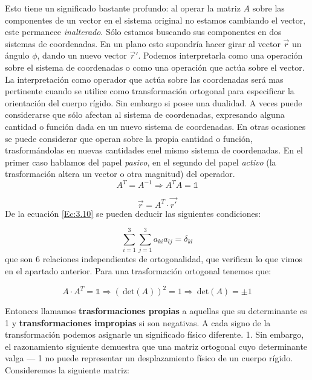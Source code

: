 \documentclass[12pt,a4paper]{book}
\newcommand{\Det}{\ \mathrm{det}}
\begin{document}
Esto tiene un significado bastante profundo: al operar la matriz $A$ sobre las componentes de un vector en el sistema original no estamos cambiando el vector, este permanece \textit{inalterado}. Sólo estamos buscando sus componentes en dos sistemas de coordenadas. En un plano esto supondría hacer girar al vector $\vec{r}$ un ángulo $\phi$, dando un nuevo vector $\vec{r}'$. Podemos interpretarla como una operación sobre el sistema de coordenadas o como una operación que actúa sobre el vector. La interpretación como operador que actúa sobre las coordenadas será mas pertinente cuando se utilice como transformación ortogonal para especificar la orientación del cuerpo rígido. Sin embargo si posee una dualidad. A veces puede considerarse que sólo afectan al sistema de coordenadas, expresando alguna cantidad o función dada en un nuevo sistema de coordenadas. En otras ocasiones se puede considerar que operan sobre la propia cantidad o función, trasformándolas en nuevas cantidades enel mismo sistema de coordenadas. En el primer caso hablamos del papel \textit{pasivo}, en el segundo del papel \textit{activo} (la trasformación altera un vector o otra magnitud) del operador.\\

\begin{equation}
A^{T} = A^{-1} \Longrightarrow A^T A = \mathds{1} \label{Ec:3.10}
\end{equation}


\begin{equation}
\vec{r} = A^T \cdot \vec{r'}
\end{equation} 
De la ecuación \ref{Ec:3.10} se pueden deducir las siguientes condiciones:

\begin{equation}
\sum_{i=1}^3 \sum_{j=1}^3 a_{ki} a_{lj} = \delta_{kl}
\end{equation}
que son 6 relaciones independientes de ortogonalidad, que verifican lo que vimos en el apartado anterior. Para una trasformación ortogonal tenemos que:

$$ A \cdot A^T = \mathds{1} \Longrightarrow (\Det (A))^2 = 1 \Longrightarrow \Det (A) = \pm 1 $$

Entonces llamamos \textbf{trasformaciones propias} a aquellas que su determinante es 1 y \textbf{transformaciones impropias} si son negativas. A cada signo de la transformación podemos asignarle un significado físico diferente. 1. Sin embargo, el
razonamiento siguiente demuestra que una matriz ortogonal cuyo determinante valga — 1
no puede representar un desplazamiento físico de un cuerpo rígido. Consideremos la siguiente matriz:
\end{document}
